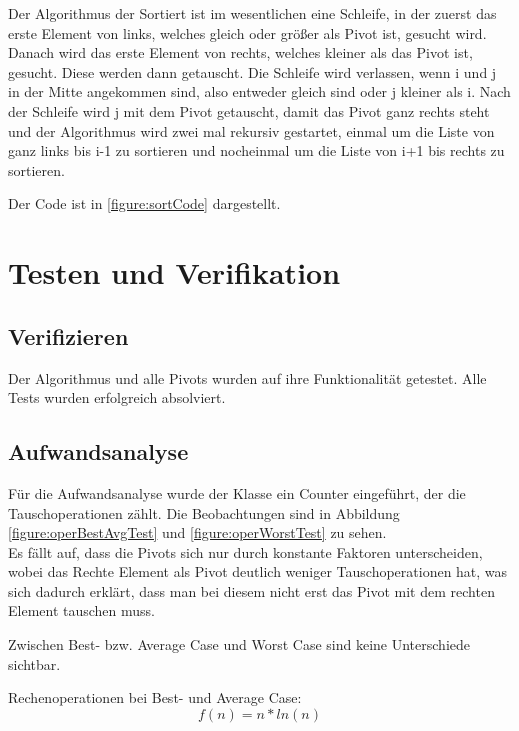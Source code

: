 \documentclass[11pt]{scrartcl}
\begin{document}
		Der Algorithmus der Sortiert ist im wesentlichen eine Schleife, in der zuerst das erste Element von links, welches gleich oder größer als Pivot ist, gesucht wird.
		Danach wird das erste Element von rechts, welches kleiner als das Pivot ist, gesucht. Diese werden dann getauscht.
		Die Schleife wird verlassen, wenn i und j in der Mitte angekommen sind, also entweder gleich sind oder j kleiner als i.
		Nach der Schleife wird j mit dem Pivot getauscht, damit das Pivot ganz rechts steht und der Algorithmus wird zwei mal rekursiv gestartet,
		einmal um die Liste von ganz links bis i-1 zu sortieren und nocheinmal um die Liste von i+1 bis rechts zu sortieren.

		Der Code ist in \ref{figure:sortCode} dargestellt.

\section{Testen und Verifikation}
\label{sec:vertests}

	\subsection{Verifizieren}
		\label{sec:veri}
		
		Der Algorithmus und alle Pivots wurden auf ihre Funktionalität getestet.
		Alle Tests wurden erfolgreich absolviert.
	
	\subsection{Aufwandsanalyse}
		\label{sec:aufwand}
		
		Für die Aufwandsanalyse wurde der Klasse ein Counter eingeführt, der die Tauschoperationen zählt. 
		Die Beobachtungen sind in Abbildung \ref{figure:operBestAvgTest} und \ref{figure:operWorstTest} zu sehen.\\
		
		Es fällt auf, dass die Pivots sich nur durch konstante Faktoren unterscheiden,
		wobei das Rechte Element als Pivot deutlich weniger Tauschoperationen hat,
		was sich dadurch erklärt, dass man bei diesem nicht erst das Pivot mit dem rechten Element tauschen muss.

		Zwischen Best- bzw. Average Case und Worst Case sind keine Unterschiede sichtbar.

		Rechenoperationen bei Best- und Average Case:
		\begin{equation*}
		f(n) = n*ln(n)
		\end{equation*}
\end{document}
